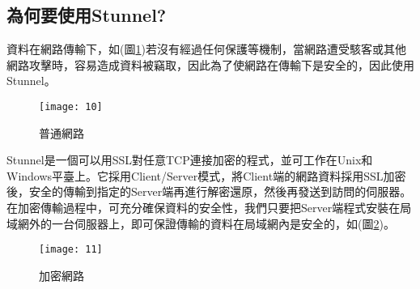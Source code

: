 \renewcommand{\baselinestretch}{20} %
\subsection{為何要使用Stunnel?}
\par
\renewcommand{\baselinestretch}{1} %
\twelve 資料在網路傳輸下，如(圖\ref{fig.普通網路})若沒有經過任何保護等機制，當網路遭受駭客或其他網路攻擊時，容易造成資料被竊取，因此為了使網路在傳輸下是安全的，因此使用Stunnel。
\\
\par
\renewcommand{\baselinestretch}{1.7} %
\begin{figure}[hbt!]
\begin{center}
\texttt{[image: 10]}
\caption{\large 普通網路}\label{fig.普通網路}
\end{center}
\end{figure}
\par

\newpage

\renewcommand{\baselinestretch}{1} %
\twelve \hspace{0.5em} Stunnel是一個可以用SSL對任意TCP連接加密的程式，並可工作在Unix和Windows平臺上。它採用Client/Server模式，將Client端的網路資料採用SSL加密後，安全的傳輸到指定的Server端再進行解密還原，然後再發送到訪問的伺服器。在加密傳輸過程中，可充分確保資料的安全性，我們只要把Server端程式安裝在局域網外的一台伺服器上，即可保證傳輸的資料在局域網內是安全的，如(圖\ref{fig.加密網路})。
\\
\par
\renewcommand{\baselinestretch}{1.7} %
\begin{figure}[hbt!]
\begin{center}
\texttt{[image: 11]}
\caption{\large 加密網路}\label{fig.加密網路}
\end{center}
\end{figure}
\par

\renewcommand{\baselinestretch}{20} %
